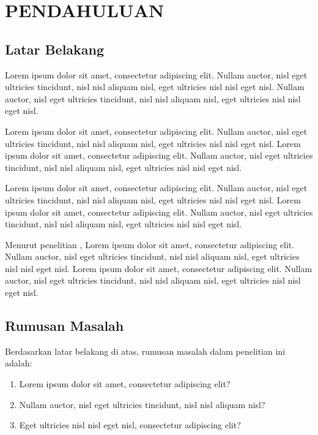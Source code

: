 \chapter{PENDAHULUAN}

\section{Latar Belakang}
Lorem ipsum dolor sit amet, consectetur adipiscing elit. Nullam auctor, nisl eget ultricies tincidunt, nisl nisl aliquam nisl, eget ultricies nisl nisl eget nisl. Nullam auctor, nisl eget ultricies tincidunt, nisl nisl aliquam nisl, eget ultricies nisl nisl eget nisl. 

Lorem ipsum dolor sit amet, consectetur adipiscing elit. Nullam auctor, nisl eget ultricies tincidunt, nisl nisl aliquam nisl, eget ultricies nisl nisl eget nisl. Lorem ipsum dolor sit amet, consectetur adipiscing elit. Nullam auctor, nisl eget ultricies tincidunt, nisl nisl aliquam nisl, eget ultricies nisl nisl eget nisl.

Lorem ipsum dolor sit amet, consectetur adipiscing elit. Nullam auctor, nisl eget ultricies tincidunt, nisl nisl aliquam nisl, eget ultricies nisl nisl eget nisl. Lorem ipsum dolor sit amet, consectetur adipiscing elit. Nullam auctor, nisl eget ultricies tincidunt, nisl nisl aliquam nisl, eget ultricies nisl nisl eget nisl.

Menurut penelitian \citet{sihombing2021comparison}, Lorem ipsum dolor sit amet, consectetur adipiscing elit. Nullam auctor, nisl eget ultricies tincidunt, nisl nisl aliquam nisl, eget ultricies nisl nisl eget nisl. Lorem ipsum dolor sit amet, consectetur adipiscing elit. Nullam auctor, nisl eget ultricies tincidunt, nisl nisl aliquam nisl, eget ultricies nisl nisl eget nisl.

\section{Rumusan Masalah}
Berdasarkan latar belakang di atas, rumusan masalah dalam penelitian ini adalah:
\begin{enumerate}
    \item Lorem ipsum dolor sit amet, consectetur adipiscing elit?
    \item Nullam auctor, nisl eget ultricies tincidunt, nisl nisl aliquam nisl?
    \item Eget ultricies nisl nisl eget nisl, consectetur adipiscing elit?
\end{enumerate}

